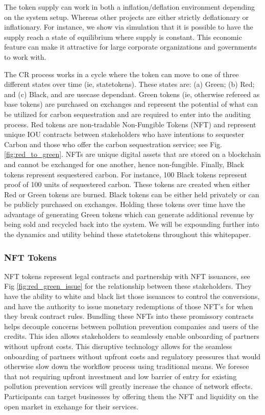 \documentclass{article}
\begin{document}
The token supply can work in both a inflation/deflation environment depending on the system setup. Whereas other projects are either strictly deflationary or inflationary. For instance, we show via simulation that it is possible to have the supply reach a state of equilibrium where supply is constant.  This economic feature can make it attractive for large corporate organizations and governments to work with.

The CR process works in a cycle where the token can move to one of three different states over time (ie, statetokens). These states are: (a) Green; (b) Red; and (c) Black, and are usecase dependant. Green tokens (ie,  otherwise refereed as base tokens) are purchased on exchanges and represent the potential of what can be utilized for carbon sequestration and are required to enter into the auditing process. Red tokens are non-tradable Non-Fungible Tokens (NFT) and represent unique IOU contracts between stakeholders who have intentions to sequester Carbon and those who offer the carbon sequestration service; see Fig. \ref{fig:red_to_green}. NFTs are unique digital assets that are stored on a blockchain and cannot be exchanged for one another, hence non-fungible. Finally, Black tokens represent sequestered carbon. For instance, 100 Black tokens represent proof of 100 units of sequestered carbon. These tokens are created when either Red or Green tokens are burned. Black tokens can be either held privately or can be publicly purchased on exchanges. Holding these tokens over time have the advantage of generating Green tokens which can generate additional revenue by being sold and recycled back into the system. We will be expounding further into the dynamics and utility behind these statetokens throughout this whitepaper.
 
\subsubsection{NFT Tokens}
\label{section:nft_tokens}

NFT tokens represent legal contracts and partnership with NFT issuances, see Fig \ref{fig:red_green_issue} for the relationship between these stakeholders. They have the ability to white and black list those issuances to control the conversions, and have the authority to issue monetary redemptions of those NFT’s for when they break contract rules. Bundling these NFTs into these promissory contracts helps decouple concerns between pollution prevention companies and users of the credits. This idea allows stakeholders to seamlessly enable onboarding of partners without upfront costs. This disruptive technology allows for the seamless onboarding of partners without upfront costs and regulatory pressures that would otherwise slow down the workflow process using traditional means. We foresee that not requiring upfront investment and low barrier of entry for existing pollution prevention services will greatly increase the chance of network effects. Participants can target businesses by offering them the NFT and liquidity on the open market in exchange for their services. 
\end{document}
